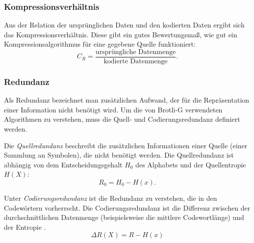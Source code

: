 \subsubsection*{Kompressionsverhältnis}
Aus der Relation der ursprünglichen Daten und den kodierten Daten ergibt sich das Kompressionsverhältnis.
Diese gibt ein gutes Bewertungsmaß, wie gut ein Kompressionsalgorithmus für eine gegebene Quelle funktioniert:
\begin{equation*}
C_R = \frac{\text{ursprüngliche Datenmenge}}{\text{kodierte Datenmenge}}.
\end{equation*}

\subsubsection*{Redundanz}
Als Redundanz bezeichnet man zusätzlichen Aufwand, der für die Repräsentation einer Information nicht benötigt wird.
Um die von Brotli-G verwendeten Algorithmen zu verstehen, muss die Quell- und Codierungsredundanz definiert werden.

Die \textit{Quellredundanz} beschreibt die zusätzlichen Informationen einer Quelle (einer Sammlung an Symbolen), die nicht benötigt werden.
Die Quellredundanz ist abhängig von dem Entscheidungsgehalt $\mathit{H_0}$ des Alphabets und der Quellentropie $\mathit{H(X)}$:
\begin{equation*}
R_0 = H_0 - H(x).
\end{equation*}

Unter \textit{Codierungsredundanz} ist die Redundanz zu verstehen, die in den Codewörtern vorherrscht.
Die Codierungsredundanz ist die Differenz zwischen der durchschnittlichen Datenmenge (beispielsweise die mittlere Codewortlänge) und der Entropie \cite{Strutz2009}.
\begin{equation*}
\Delta R(X) = R - H(x)
\end{equation*}

